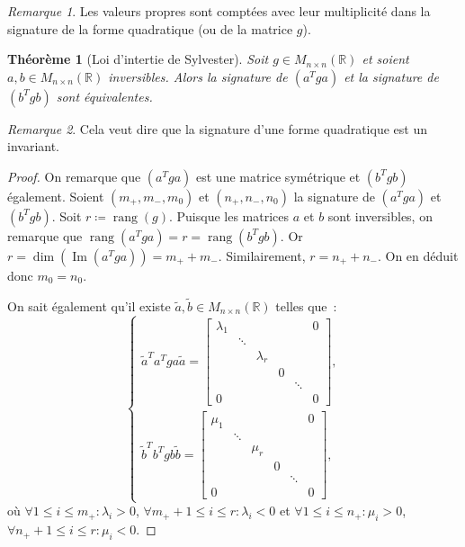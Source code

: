 \documentclass{article}
\DeclareMathOperator{\Imf}{Im}
\DeclareMathOperator{\rang}{rang}
\newcommand{\R}{\mathbb R}
\newcommand{\M}[3]{M_{#1 \times #2}(#3)}
\newtheorem{thm}{Théorème}[section]
\theoremstyle{definition}
\theoremstyle{remark}
\newtheorem*{rmq}{Remarque}
\begin{document}
		\begin{rmq} Les valeurs propres sont comptées avec leur multiplicité dans la signature de la forme quadratique (ou de la matrice $g$).
		\end{rmq}

		\begin{thm}[Loi d'intertie de Sylvester] Soit $g \in \M nn\R$ et soient $a, b \in \M nn\R$ inversibles. Alors la signature de $(a^Tga)$ et la signature de
		$(b^Tgb)$ sont équivalentes.
		\end{thm}

		\begin{rmq} Cela veut dire que la signature d'une forme quadratique est un invariant.
		\end{rmq}

		\begin{proof} On remarque que $(a^Tga)$ est une matrice symétrique et $(b^Tgb)$ également. Soient $(m_+, m_-, m_0)$ et $(n_+, n_-, n_0)$ la signature de
		$(a^Tga)$ et $(b^Tgb)$. Soit $r \coloneqq \rang(g)$. Puisque les matrices $a$ et $b$ sont inversibles, on remarque que $\rang(a^Tga) = r = \rang(b^Tgb)$.
		Or $r = \dim(\Imf(a^Tga)) = m_+ + m_-$. Similairement, $r = n_+ + n_-$. On en déduit donc $m_0 = n_0$.

		On sait également qu'il existe $\widetilde a, \widetilde b \in \M nn\R$ telles que~:
		\[\begin{cases}
			\widetilde a^Ta^Tga\widetilde a =
				\begin{bmatrix}
					\lambda_1 &        &           &   &        & 0 \\
					          & \ddots &           &   &        & \\
					          &        & \lambda_r &   &        & \\
					          &        &           & 0 &        & \\
					          &        &           &   & \ddots & \\
					0         &        &           &   &        & 0
				\end{bmatrix}, \\
			\widetilde b^Tb^Tgb\widetilde b =
				\begin{bmatrix}
					\mu_1 &        &       &   &        & 0 \\
					      & \ddots &       &   &        & \\
					      &        & \mu_r &   &        & \\
					      &        &       & 0 &        & \\
					      &        &       &   & \ddots & \\
					0     &        &       &   &        & 0
				\end{bmatrix},
		\end{cases}\]
		où $\forall 1 \leq i \leq m_+ : \lambda_i > 0$, $\forall m_++1 \leq i \leq r : \lambda_i < 0$ et $\forall 1 \leq i \leq n_+ : \mu_i > 0$,
		$\forall n_++1 \leq i \leq r : \mu_i < 0$.


\end{proof}
\end{document}
